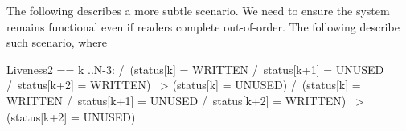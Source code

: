 The following describes a more subtle scenario. We need to ensure the system
remains functional even if readers complete out-of-order. The following describe such 
scenario, where 

\begin{tla}
Liveness2 == 
    \A k ..N-3:
    /\ (status[k] = WRITTEN /\ status[k+1] = UNUSED /\ status[k+2] = WRITTEN) ~> (status[k] = UNUSED)
    /\ (status[k] = WRITTEN /\ status[k+1] = UNUSED /\ status[k+2] = WRITTEN) ~> (status[k+2] = UNUSED)
\end{tla}
\begin{tlatex}
%
%
\end{tlatex}

% 
